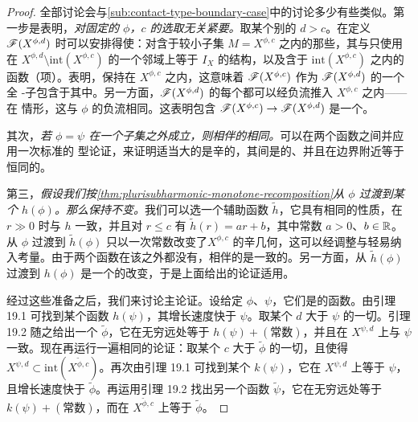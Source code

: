 \begin{proof}
全部讨论会与\cref{sub:contact-type-boundary-case}中的讨论多少有些类似。第一步是表明，\emph{对固定的 $\phi$，$c$ 的选取无关紧要。}取某个别的 $d>c$。在定义 $\mathscr{F}(X^{\phi,d})$ 时可以安排得使：对含于较小子集 $M=X^{\phi,c}$ 之内的那些\trExact{}\trLagrange\trSubmanifold，其\trFloerDatum{}与\trPerturbationDatum{}只使用在 $X^{\phi,d}\setminus\mathrm{int}(X^{\phi,c})$ 的一个邻域上等于 $I_X$ 的\trAlmostComplex{}结构，以及\trSupport{}含于 $\mathrm{int}(X^{\phi,c})$ 之内的\trHamilton{}函数（\trInhomogeneous{}项）。\trMaximumPrinciple{}表明，\trInhomogeneous{}\trPseudoholomorphic\trPolygon{}保持在 $X^{\phi,c}$ 之内，这意味着 $\mathscr{F}(X^{\phi,c})$ 作为 $\mathscr{F}(X^{\phi,d})$ 的一个全 \trAinfty-子\trCategory{}包含于其中。另一方面，$\mathscr{F}(X^{\phi,d})$ 的每个\trExact{}\trLagrange\trSubmanifold{}都可以经负\trLiouville{}流推入 $X^{\phi,c}$ 之内——在 \trStein{}情形，这与 $\phi$ 的负\trGradient{}流相同。这表明包含 $\mathscr{F}(X^{\phi,c})\to\mathscr{F}(X^{\phi,d})$ 是一个\trQuasiequivalence。

其次，\emph{若 $\phi=\psi$ 在一个\trCompact{}子集之外成立，则相伴的\trFukayaCategory{}相同。}可以在两个函数之间\trInterpolation{}并应用一次标准的 \trMoser{}型论证，来证明适当大的\trSublevelSet{}是辛\trIsomorphic{}的，其间是\trExact{}的、并且在边界附近等于恒同的\trSymplectic{}\trIsomorphism。

第三，\emph{假设我们按\cref{thm:plurisubharmonic-monotone-recomposition}从 $\phi$ 过渡到某个 $h(\phi)$。那么\trFukayaCategory{}保持不变。}我们可以选一个辅助函数 $\tilde{h}$，它具有相同的性质，在 $r\gg 0$ 时与 $h$ 一致，并且对 $r\le c$ 有 $\tilde{h}(r)=ar+b$，其中常数 $a>0$、$b\in\mathbb{R}$。从 $\phi$ 过渡到 $\tilde{h}(\phi)$ 只以一次常数\trRescaling{}改变了\trSublevelSet{}$X^{\phi,c}$ 的辛几何，这可以经调整\trFloerDatum{}与\trPerturbationDatum{}轻易纳入考量。由于两个函数在该\trSublevelSet{}之外都没有\trCriticalPoint，相伴的\trFukayaCategory{}是一致的。另一方面，从 $\tilde{h}(\phi)$ 过渡到 $h(\phi)$ 是一个\trCompactlySupported{}的改变，于是上面给出的论证适用。

经过这些准备之后，我们来讨论主论证。设给定 $\phi$、$\psi$，它们是\trExhausting{}的\trFiniteType{}\trPlurisubharmonic{}函数。由引理 19.1 可找到某个函数 $h(\psi)$，其增长速度快于 $\psi$。取某个 $d$ 大于 $\psi$ 的一切\trCriticalValue。引理 19.2 随之给出一个 $\tilde{\phi}$，它在无穷远处等于 $h(\psi)+(\text{常数})$，并且在 $X^{\psi,d}$ 上与 $\psi$ 一致。现在再运行一遍相同的论证：取某个 $c$ 大于 $\tilde{\phi}$ 的一切\trCriticalValue，且使得 $X^{\psi,d}\subset\mathrm{int}(X^{\tilde{\phi},c})$。再次由引理 19.1 可找到某个 $k(\psi)$，它在 $X^{\psi,d}$ 上等于 $\psi$，且增长速度快于 $\tilde{\phi}$。再运用引理 19.2 找出另一个函数 $\tilde{\psi}$，它在无穷远处等于 $k(\psi)+(\text{常数})$，而在 $X^{\tilde{\phi},c}$ 上等于 $\tilde{\phi}$。


\end{proof}
